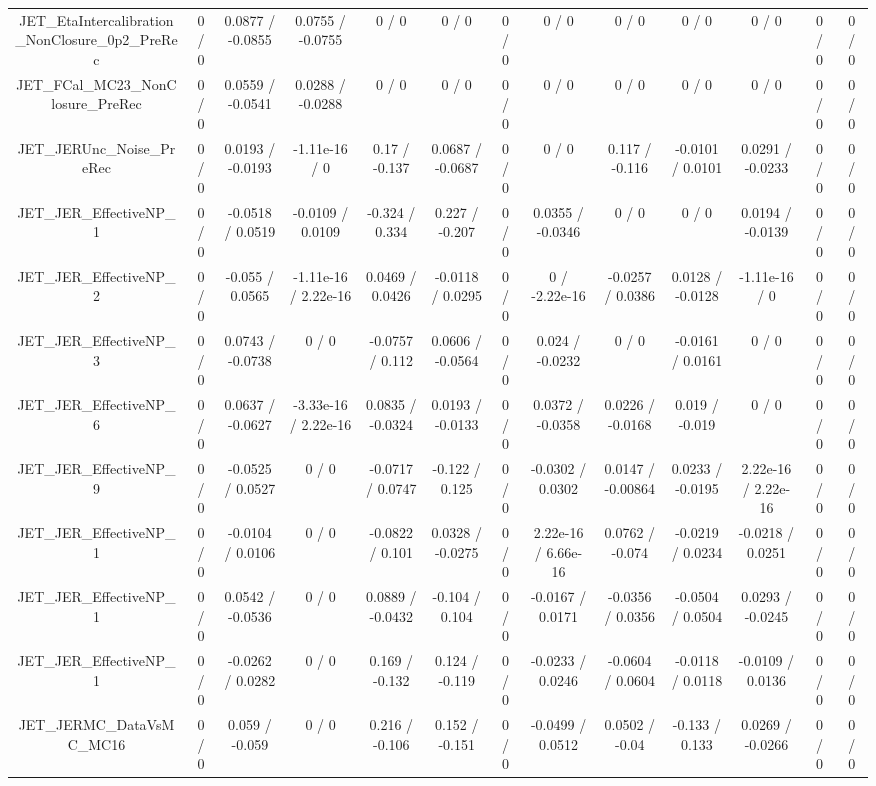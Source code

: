 \documentclass[10pt]{article}
\begin{document}
\begin{table}[htbp]
\begin{center}
\begin{tabular}{|c|c|c|c|c|c|c|c|c|c|c|c|c|}
  JET_EtaIntercalibration_NonClosure_0p2_PreRec & 0 / 0 & 0.0877 / -0.0855 & 0.0755 / -0.0755 & 0 / 0 & 0 / 0 & 0 / 0 & 0 / 0 & 0 / 0 & 0 / 0 & 0 / 0 & 0 / 0 & 0 / 0 \\ 
  JET_FCal_MC23_NonClosure_PreRec & 0 / 0 & 0.0559 / -0.0541 & 0.0288 / -0.0288 & 0 / 0 & 0 / 0 & 0 / 0 & 0 / 0 & 0 / 0 & 0 / 0 & 0 / 0 & 0 / 0 & 0 / 0 \\ 
  JET_JERUnc_Noise_PreRec & 0 / 0 & 0.0193 / -0.0193 & -1.11e-16 / 0 & 0.17 / -0.137 & 0.0687 / -0.0687 & 0 / 0 & 0 / 0 & 0.117 / -0.116 & -0.0101 / 0.0101 & 0.0291 / -0.0233 & 0 / 0 & 0 / 0 \\ 
  JET_JER_EffectiveNP_1 & 0 / 0 & -0.0518 / 0.0519 & -0.0109 / 0.0109 & -0.324 / 0.334 & 0.227 / -0.207 & 0 / 0 & 0.0355 / -0.0346 & 0 / 0 & 0 / 0 & 0.0194 / -0.0139 & 0 / 0 & 0 / 0 \\ 
  JET_JER_EffectiveNP_2 & 0 / 0 & -0.055 / 0.0565 & -1.11e-16 / 2.22e-16 & 0.0469 / 0.0426 & -0.0118 / 0.0295 & 0 / 0 & 0 / -2.22e-16 & -0.0257 / 0.0386 & 0.0128 / -0.0128 & -1.11e-16 / 0 & 0 / 0 & 0 / 0 \\ 
  JET_JER_EffectiveNP_3 & 0 / 0 & 0.0743 / -0.0738 & 0 / 0 & -0.0757 / 0.112 & 0.0606 / -0.0564 & 0 / 0 & 0.024 / -0.0232 & 0 / 0 & -0.0161 / 0.0161 & 0 / 0 & 0 / 0 & 0 / 0 \\ 
  JET_JER_EffectiveNP_6 & 0 / 0 & 0.0637 / -0.0627 & -3.33e-16 / 2.22e-16 & 0.0835 / -0.0324 & 0.0193 / -0.0133 & 0 / 0 & 0.0372 / -0.0358 & 0.0226 / -0.0168 & 0.019 / -0.019 & 0 / 0 & 0 / 0 & 0 / 0 \\ 
  JET_JER_EffectiveNP_9 & 0 / 0 & -0.0525 / 0.0527 & 0 / 0 & -0.0717 / 0.0747 & -0.122 / 0.125 & 0 / 0 & -0.0302 / 0.0302 & 0.0147 / -0.00864 & 0.0233 / -0.0195 & 2.22e-16 / 2.22e-16 & 0 / 0 & 0 / 0 \\ 
  JET_JER_EffectiveNP_1 & 0 / 0 & -0.0104 / 0.0106 & 0 / 0 & -0.0822 / 0.101 & 0.0328 / -0.0275 & 0 / 0 & 2.22e-16 / 6.66e-16 & 0.0762 / -0.074 & -0.0219 / 0.0234 & -0.0218 / 0.0251 & 0 / 0 & 0 / 0 \\ 
  JET_JER_EffectiveNP_1 & 0 / 0 & 0.0542 / -0.0536 & 0 / 0 & 0.0889 / -0.0432 & -0.104 / 0.104 & 0 / 0 & -0.0167 / 0.0171 & -0.0356 / 0.0356 & -0.0504 / 0.0504 & 0.0293 / -0.0245 & 0 / 0 & 0 / 0 \\ 
  JET_JER_EffectiveNP_1 & 0 / 0 & -0.0262 / 0.0282 & 0 / 0 & 0.169 / -0.132 & 0.124 / -0.119 & 0 / 0 & -0.0233 / 0.0246 & -0.0604 / 0.0604 & -0.0118 / 0.0118 & -0.0109 / 0.0136 & 0 / 0 & 0 / 0 \\ 
  JET_JERMC_DataVsMC_MC16 & 0 / 0 & 0.059 / -0.059 & 0 / 0 & 0.216 / -0.106 & 0.152 / -0.151 & 0 / 0 & -0.0499 / 0.0512 & 0.0502 / -0.04 & -0.133 / 0.133 & 0.0269 / -0.0266 & 0 / 0 & 0 / 0 \\ 

\end{tabular}
\end{center}
\end{table}
\end{document}
